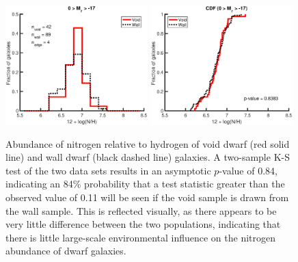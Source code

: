 \begin{figure}
    \centering
    \includegraphics[width=0.49\textwidth]{Images/Paper2/1sig_dwarf_SF_t3_12logNH_hist}
    \includegraphics[width=0.49\textwidth]{Images/Paper2/1sig_dwarf_SF_t3_12logNH_CDF}
    \caption[Nitrogen distribution of 135 dwarf galaxy sample]{Abundance of 
    nitrogen relative to hydrogen of void dwarf (red solid line) and wall dwarf 
    (black dashed line) galaxies.  A two-sample K-S test of the two data sets 
    results in an asymptotic $p$-value of 0.84, indicating an 84\% probability 
    that a test statistic greater than the observed value of 0.11 will be seen 
    if the void sample is drawn from the wall sample.  This is reflected 
    visually, as there appears to be very little difference between the two 
    populations, indicating that there is little large-scale environmental 
    influence on the nitrogen abundance of dwarf galaxies.}
    \label{fig:N_1sig}
\end{figure}

